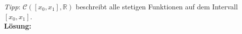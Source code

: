 \noindent \textit{Tipp}: $\mathcal{C} ([x_0,x_1], \mathbb{R})$ beschreibt alle stetigen Funktionen auf dem Intervall $[x_0,x_1]$. \\

\noindent \textbf{Lösung:}



\newpage

